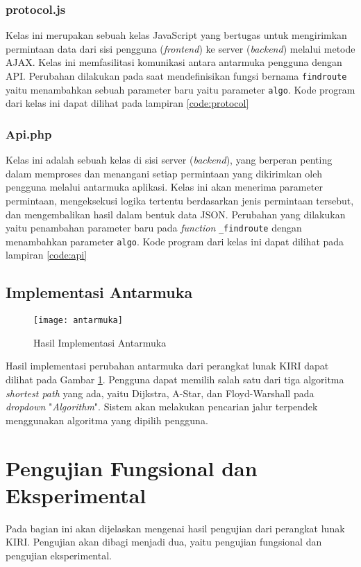 \subsubsection{protocol.js}
Kelas ini merupakan sebuah kelas JavaScript yang bertugas untuk mengirimkan permintaan data dari sisi pengguna (\textit{frontend}) ke server (\textit{backend}) melalui metode AJAX. Kelas ini memfasilitasi komunikasi antara antarmuka pengguna dengan API. Perubahan dilakukan pada saat mendefinisikan fungsi bernama \texttt{findroute} yaitu menambahkan sebuah parameter baru yaitu parameter \texttt{algo}. Kode program dari kelas ini dapat dilihat pada lampiran \ref{code:protocol}

\subsubsection{Api.php}
Kelas ini adalah sebuah kelas di sisi server (\textit{backend}), yang berperan penting dalam memproses dan menangani setiap permintaan yang dikirimkan oleh pengguna melalui antarmuka aplikasi. Kelas ini akan menerima parameter permintaan, mengeksekusi logika tertentu berdasarkan jenis permintaan tersebut, dan mengembalikan hasil dalam bentuk data JSON. Perubahan yang dilakukan yaitu penambahan parameter baru pada \textit{function} \texttt{\_findroute} dengan menambahkan parameter \texttt{algo}. Kode program dari kelas ini dapat dilihat pada lampiran \ref{code:api}

\subsection{Implementasi Antarmuka}
\label{subsec:penjelasankode}
\begin{figure}[H]
    \centering
    \texttt{[image: antarmuka]}
    \caption{Hasil Implementasi Antarmuka}
    \label{fig:antarmuka}
\end{figure}

\noindent
Hasil implementasi perubahan antarmuka dari perangkat lunak KIRI dapat dilihat pada Gambar \ref{fig:antarmuka}. Pengguna dapat memilih salah satu dari tiga algoritma \textit{shortest path} yang ada, yaitu Dijkstra, A-Star, dan Floyd-Warshall pada \textit{dropdown} "\textit{Algorithm}". Sistem akan melakukan pencarian jalur terpendek menggunakan algoritma yang dipilih pengguna.

\section{Pengujian Fungsional dan Eksperimental}
\label{sec:pengujian}
Pada bagian ini akan dijelaskan mengenai hasil pengujian dari perangkat lunak KIRI. Pengujian akan dibagi menjadi dua, yaitu pengujian fungsional dan pengujian eksperimental.

